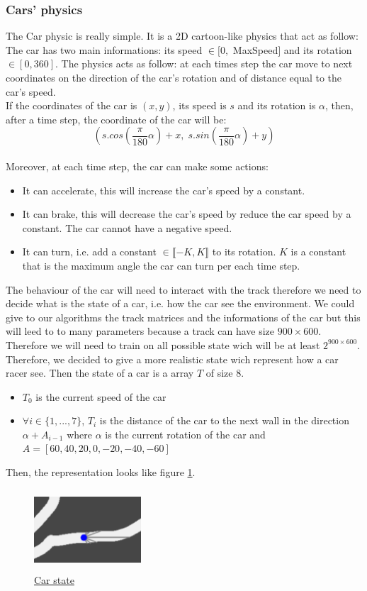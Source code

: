\documentclass[11pt,a4paper]{article}
\newcounter{fig}
\newcommand{\mlist}[1]{\begin{itemize}[noitemsep,topsep=0pt]#1\end{itemize}}
\begin{document}
			\subsubsection*{Cars' physics}
The Car physic is really simple. It is a 2D cartoon-like physics that act as follow:\\
The car has two main informations: its speed $\in [0,$ MaxSpeed$]$ and its rotation $\in [0,360]$. The physics acts as follow: at each times step the car move to next coordinates on the direction of the car's rotation and of distance equal to the car's speed.\\
If the coordinates of the car is $(x,y)$, its speed is $s$ and its rotation is $\alpha$, then, after a time step, the coordinate of the car will be:
\[(s.cos(\frac{\pi}{180}\alpha) + x,\; s.sin(\frac{\pi}{180}\alpha) + y)\]
\\
Moreover, at each time step, the car can make some actions:
\mlist{
\item It can accelerate, this will increase the car's speed by a constant.
\item It can brake, this will decrease the car's speed by reduce the car speed by a constant. The car cannot have a negative speed.
\item It can turn, i.e. add a constant $\in \llbracket-K,K\rrbracket$ to its rotation. $K$ is a constant that is the maximum angle the car can turn per each time step.
}
The behaviour of the car will need to interact with the track therefore we need to decide what is the state of a car, i.e. how the car see the environment. We could give to our algorithms the track matrices and the informations of the car but this will leed to to many parameters because a track can have size $900\times600$. Therefore we will need to train on all possible state wich will be at least $2^{900\times 600}$. Therefore, we decided to give a more realistic state wich represent how a car racer see. Then the state of a car is a array $T$ of size $8$.
\mlist{
\item $T_0$ is the current speed of the car
\item $\forall i\in\{1,...,7\}$, $T_i$ is the distance of the car to the next wall in the direction $\alpha + A_{i-1}$ where $\alpha$ is the current rotation of the car and $A=[60, 40, 20, 0, -20, -40, -60]$
}
Then, the representation looks like figure \ref{figure:car state}.
\begin{center}
	\begin{figure}[ht]
		\centering
		\includegraphics[width=4cm, height=3cm]{car_state.png}
		\caption{\underline{Car state}}
		\label{figure:car state}
	\end{figure}
\end{center}
		
\end{document}
